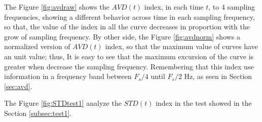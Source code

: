 \documentclass[review]{elsarticle}
\begin{document}
The Figure \ref{fig:avdraw} shows the $AVD(t)$ index, in each time $t$, 
to 4 sampling frequencies, showing a different behavior across time in each sampling frequency,
so that, the value of the index in all  the curve decreases in proportion with 
the grow of sampling frequency. By other side,
the Figure \ref{fig:avdnorm} shows a normalized version of $AVD(t)$ index, 
so that the maximum value of curves have an unit value; thus,
It is easy to see that the maximum excursion of the curve is greater when decrease
the sampling frequency. Remembering that this index use information in a frequency
band between $F_s/4$ until $F_s/2$ Hz, as seen in Section \ref{sec:avd}.

The Figure \ref{fig:STDtest1} analyze the $STD(t)$ index in the test showed in the 
Section \ref{subsec:test1}.
\end{document}
